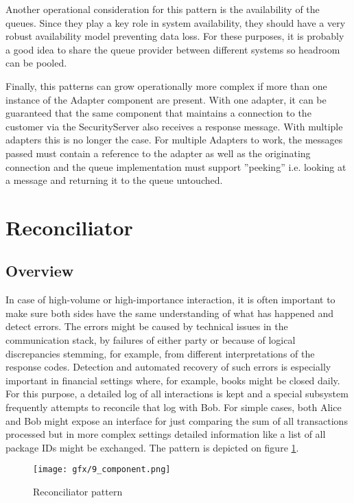 \documentclass[10pt,a4paper]{article}
\begin{document}
Another operational consideration for this pattern is the availability of the queues. Since they play a key role in system availability, they should have a very robust availability model preventing data loss. For these purposes, it is probably a good idea to share the queue provider between different systems so headroom can be pooled.

Finally, this patterns can grow operationally more complex if more than one instance of the Adapter component are present. With one adapter, it can be guaranteed that the same component that maintains a connection to the customer via the SecurityServer also receives a response message. With multiple adapters this is no longer the case. For multiple Adapters to work, the messages passed must contain a reference to the adapter as well as the originating connection and the queue implementation must support ''peeking'' i.e. looking at a message and returning it to the queue untouched.
 
\section{Reconciliator}
\label{sec:p:9}
\subsection{Overview}
In case of high-volume or high-importance interaction, it is often important to make sure both sides have the same understanding of what has happened and detect errors. The errors might be caused by technical issues in the communication stack, by failures of either party or because of logical discrepancies stemming, for example, from different interpretations of the response codes. Detection and automated recovery of such errors is especially important in financial settings where, for example, books might be closed daily. For this purpose, a detailed log of all interactions is kept and a special subsystem frequently attempts to reconcile that log with Bob. For simple cases, both Alice and Bob might expose an interface for just comparing the sum of all transactions processed but in more complex settings detailed information like a list of all package IDs might be exchanged. The pattern is depicted on figure \ref{fig:p:9}.
\begin{figure}[htp]
	\begin{center}
		\texttt{[image: gfx/9\_component.png]}
		\caption{Reconciliator pattern}
		\label{fig:p:9}
	\end{center}
\end{figure}
\end{document}
